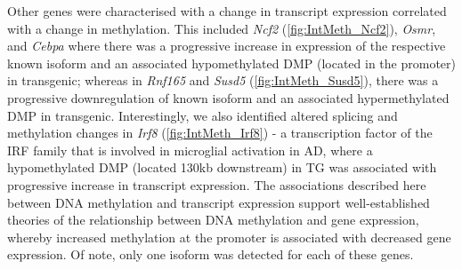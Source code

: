 \newpage
Other genes were characterised with a change in transcript expression correlated with a change in methylation. This included \textit{Ncf2} (\cref{fig:IntMeth_Ncf2}), \textit{Osmr}, and \textit{Cebpa} where there was a progressive increase in expression of the respective known isoform and an associated hypomethylated DMP (located in the promoter) in transgenic; whereas in \textit{Rnf165} and \textit{Susd5} (\cref{fig:IntMeth_Susd5}), there was a progressive downregulation of known isoform and an associated hypermethylated DMP in transgenic. Interestingly, we also identified altered splicing and methylation changes in \textit{Irf8} (\cref{fig:IntMeth_Irf8}) - a transcription factor of the IRF family that is involved in microglial activation in AD\cite{Zeng2017}, where a hypomethylated DMP (located 130kb downstream) in TG was associated with progressive increase in transcript expression. The associations described here between DNA methylation and transcript expression support well-established theories of the relationship between DNA methylation and gene expression, whereby increased methylation at the promoter is associated with decreased gene expression. Of note, only one isoform was detected for each of these genes.  

